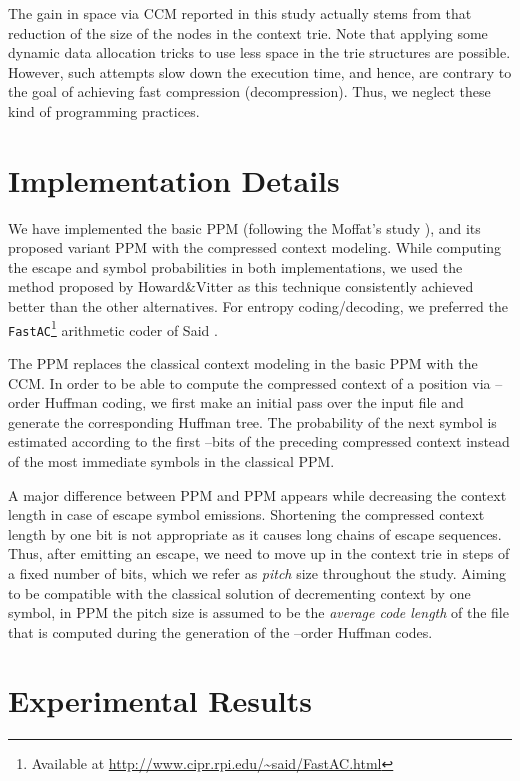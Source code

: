 \documentclass[runningheads,a4paper]{llncs}
\begin{document}
The gain in space via CCM reported in this study actually stems from that reduction of the size of the nodes in the
context trie. 
Note that applying some dynamic data allocation tricks to use less space in the trie structures are possible. However,
such attempts slow down the execution time, and hence, are contrary to the goal of achieving fast compression 
(decompression).
Thus, we neglect these kind of programming practices.

\section{Implementation Details}

We have implemented the basic PPM (following the Moffat's study \cite{Moffat90}), and its proposed variant PPM
with the compressed context modeling. 
While computing the escape and symbol probabilities in both implementations, we used the method proposed by
Howard\&Vitter \cite{HV92} as this technique consistently achieved better than the other alternatives. 
For entropy coding/decoding, we preferred the \texttt{FastAC}\footnote{Available at
\url{http://www.cipr.rpi.edu/~said/FastAC.html}} arithmetic coder of Said \cite{said2004introduction}. 

The PPM replaces the classical context modeling in the basic PPM with the CCM. 
In order to be able to compute the compressed context of a position via --order Huffman coding, we first make
an initial pass over the input file and generate the corresponding Huffman tree. 
The probability of the next symbol is estimated according to the first --bits of the preceding compressed context
instead of the most immediate symbols in the classical PPM.  

A major difference between PPM and PPM appears while decreasing the context length in case of escape symbol
emissions. Shortening the compressed context length by one bit is not appropriate as it causes long chains of escape
sequences. Thus, after emitting an escape, we need to move up in the context trie in steps of a fixed number of bits,
which we refer as \emph{pitch} size throughout the study. 
Aiming to be compatible with the classical solution of decrementing context by one symbol, in PPM the pitch size
is assumed to be the \emph{average code length} of the file that is computed during the generation of the
--order Huffman codes. 


\section{Experimental Results}
\end{document}
